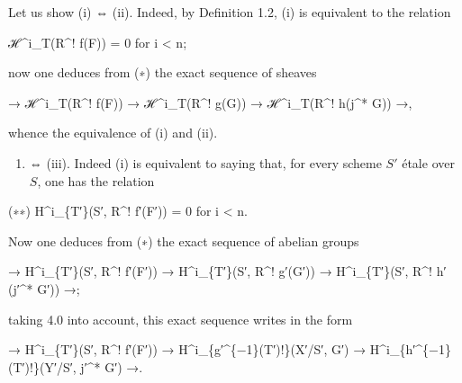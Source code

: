 \documentclass[
  11pt,
  a4paper,
]{book}
\newenvironment{Shaded}{}{}
\newcommand{\NormalTok}[1]{#1}
\providecommand{\tightlist}{%
  \setlength{\itemsep}{0pt}\setlength{\parskip}{0pt}}
\begin{document}
Let us show (i) ⇔ (ii). Indeed, by Definition 1.2, (i) is equivalent to
the relation

\begin{Shaded}
\begin{Highlighting}[]
\NormalTok{ℋ\^{}i\_T(R\^{}! f(F)) = 0 for i \textless{} n;}
\end{Highlighting}
\end{Shaded}

now one deduces from (∗) the exact sequence of sheaves

\begin{Shaded}
\begin{Highlighting}[]
\NormalTok{→ ℋ\^{}i\_T(R\^{}! f(F)) → ℋ\^{}i\_T(R\^{}! g(G)) → ℋ\^{}i\_T(R\^{}! h(j\^{}* G)) →,}
\end{Highlighting}
\end{Shaded}

whence the equivalence of (i) and (ii).

\begin{enumerate}
\def\labelenumi{(\roman{enumi})}
\tightlist
\item
  ⇔ (iii). Indeed (i) is equivalent to saying that, for every scheme
  \(S'\) étale over \(S\), one has the relation
\end{enumerate}

\begin{Shaded}
\begin{Highlighting}[]
\NormalTok{(∗∗) H\^{}i\_\{T′\}(S′, R\^{}! f′(F′)) = 0 for i \textless{} n.}
\end{Highlighting}
\end{Shaded}

Now one deduces from (∗) the exact sequence of abelian groups

\begin{Shaded}
\begin{Highlighting}[]
\NormalTok{→ H\^{}i\_\{T′\}(S′, R\^{}! f′(F′)) → H\^{}i\_\{T′\}(S′, R\^{}! g′(G′)) → H\^{}i\_\{T′\}(S′, R\^{}! h′(j′\^{}* G′)) →;}
\end{Highlighting}
\end{Shaded}

taking 4.0 into account, this exact sequence writes in the form

\begin{Shaded}
\begin{Highlighting}[]
\NormalTok{→ H\^{}i\_\{T′\}(S′, R\^{}! f′(F′)) → H\^{}i\_\{g′\^{}\{−1\}(T′)!\}(X′/S′, G′) → H\^{}i\_\{h′\^{}\{−1\}(T′)!\}(Y′/S′, j′\^{}* G′) →.}
\end{Highlighting}
\end{Shaded}
\end{document}
